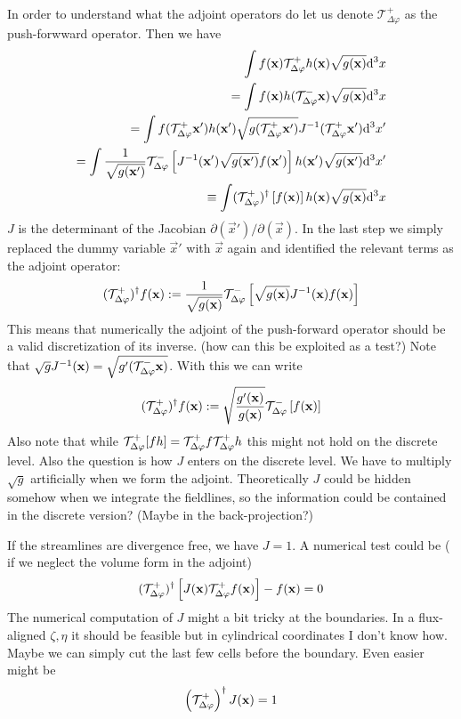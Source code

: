 In order to understand what the adjoint operators do let us denote $\mathcal T^+_{\Delta\varphi}$ as the push-forwward operator. Then we have
\begin{align}
    \int f({\mathbf{x}}) \mathcal T^+_{\Delta\varphi} h({\mathbf{x}}) \sqrt{g({\mathbf{x}})}\mathrm{d}^3x \\
    =  \int f({\mathbf{x}}) h(\mathcal T^-_{\Delta\varphi} {\mathbf{x}})\sqrt{g({\mathbf{x}})}\mathrm{d}^3x \\
    =  \int f(\mathcal T^+_{\Delta\varphi} {\mathbf{x}}') h({\mathbf{x}}')\sqrt{g(\mathcal T^+_{\Delta\varphi} {\mathbf{x}}')}J^{-1}( \mathcal T^+_{\Delta\varphi}{\mathbf{x}}') \mathrm{d}^3x' \\
    =  \int \frac{1}{\sqrt{g({\mathbf{x}}')}}\mathcal T^-_{\Delta\varphi}\left[J^{-1}({\mathbf{x}}')\sqrt{g({\mathbf{x}}')}f({\mathbf{x}}')\right] h({\mathbf{x}}')\sqrt{g({\mathbf{x}}')}   \mathrm{d}^3x' \\
    \equiv  \int (\mathcal T^+_{\Delta\varphi})^\dagger\left[f({\mathbf{x}})\right] h({\mathbf{x}})\sqrt{g({\mathbf{x}})}   \mathrm{d}^3x
    \label{}
\end{align}
$J$ is the determinant of the Jacobian $\partial(\vec x')/\partial(\vec x)$.
In the last step we simply replaced the dummy variable $\vec x'$ with $\vec x$ again and identified the relevant terms
as the adjoint operator:
\begin{align}
    (\mathcal T^+_{\Delta\varphi})^\dagger f({\mathbf{x}} ) := \frac{1}{\sqrt{g({\mathbf{x}})}} \mathcal T^-_{\Delta\varphi}\left[\sqrt{g({\mathbf{x}})} J^{-1}({\mathbf{x}}) f({\mathbf{x}}) \right]
    \label{}
\end{align}
This means that numerically the adjoint of the push-forward 
operator should be a valid discretization of its inverse. (how can this be exploited as a test?)
Note that $\sqrt{g}J^{-1}({\mathbf{x}}) = \sqrt{g'(\mathcal T^-_{\Delta\varphi} {\mathbf{x}})}$.
With this we can write
\begin{align}
    (\mathcal T^+_{\Delta\varphi})^\dagger f({\mathbf{x}} ) := \sqrt{\frac{g'({\mathbf{x}})}{g({\mathbf{x}})}} \mathcal T^-_{\Delta\varphi}\left[f({\mathbf{x}}) \right]
    \label{}
\end{align}
Also note that while $\mathcal T^+_{\Delta\varphi} [fh] = \mathcal T^+_{\Delta\varphi} f \mathcal T^+_{\Delta\varphi} h$ this might not 
hold on the discrete level. Also the question is how $J$ enters 
on the discrete level. We have to multiply $\sqrt{g}$ artificially when we form the adjoint. 
Theoretically $J$ could be hidden somehow when we integrate the fieldlines, so the information could be contained in the discrete version? (Maybe in the back-projection?)

If the streamlines are divergence free, we have $J=1$.
A numerical test could be ( if we neglect the volume form in the adjoint)
\begin{align}
    (\mathcal T^+_{\Delta\varphi})^\dagger \left[J({\mathbf{x}})\mathcal T^+_{\Delta\varphi} f({\mathbf{x}})\right] - f({\mathbf{x}}) = 0
    \label{}
\end{align}
The numerical computation of $J$ might a bit tricky at the boundaries. 
In a flux-aligned $\zeta, \eta$ it should be feasible but in cylindrical coordinates I don't know how. Maybe we can simply cut the last few cells before the boundary.
Even easier might be
\begin{align}
    \left(\mathcal T^+_{\Delta\varphi}\right)^\dagger J({\mathbf{x}} ) = 1
    \label{}
\end{align}

